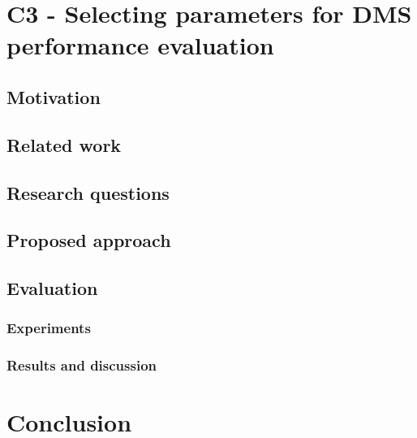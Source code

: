 \documentclass{article}
\begin{document}
\section{C3 - Selecting parameters for DMS performance evaluation}
\subsection{Motivation}
\subsection{Related work}
\subsection{Research questions}
\subsection{Proposed approach}
\subsection{Evaluation}
\subsubsection{Experiments}
\subsubsection{Results and discussion}

\section{Conclusion}



 
\end{document}
